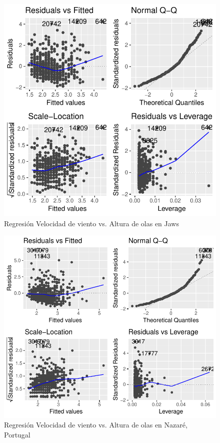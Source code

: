 \begin{figure}[H]
    \centering
    \includegraphics{./figures/jaws_500_lm.pdf}
    \caption{Regresión Velocidad de viento vs. Altura de olas en Jaws}
    \label{fig:wind_waves_jaws_fit_anal}
\end{figure}

\begin{figure}[H]
    \centering
    \includegraphics{./figures/nazare_500_lm.pdf}
    \caption{Regresión Velocidad de viento vs. Altura de olas en Nazaré, Portugal}
    \label{fig:wind_waves_nazare_fit_anal}
\end{figure}


